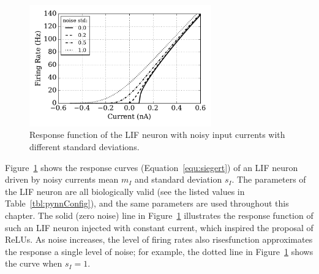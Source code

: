 	
	\begin{figure}[bt]
		\centering
		\includegraphics[width=0.7\textwidth]{pics_iconip/1.pdf}
		\DIFdelbeginFL %
\DIFdelendFL \DIFaddbeginFL \caption[Response function of the LIF neuron.]{\DIFaddendFL Response function of the LIF neuron with noisy input currents with different standard deviations.}
		\label{Fig:physics}
	\end{figure}

	Figure~\ref{Fig:physics} shows the response curves (Equation~\ref{equ:siegert}) of an LIF neuron driven by noisy currents \DIFdelbegin {}\DIFdelend \DIFaddbegin {}\DIFaddend mean $m_I$ and standard deviation $s_I$.
	The parameters of the LIF neuron are all biologically valid (see the listed values in Table~\ref{tbl:pynnConfig}), and the same parameters are used throughout this chapter.
	The solid (zero noise) line in Figure~\ref{Fig:physics} illustrates the response function of such an LIF neuron injected with constant current, which inspired the proposal of ReLUs.
	As noise increases, the level of firing rates also rises\DIFdelbegin {}\DIFdelend \DIFaddbegin {}\DIFaddend function approximates the response \DIFdelbegin {}\DIFdelend \DIFaddbegin {}\DIFaddend a single level of noise; for example, the dotted line in Figure~\ref{Fig:physics} shows the curve when $s_I=1$.

